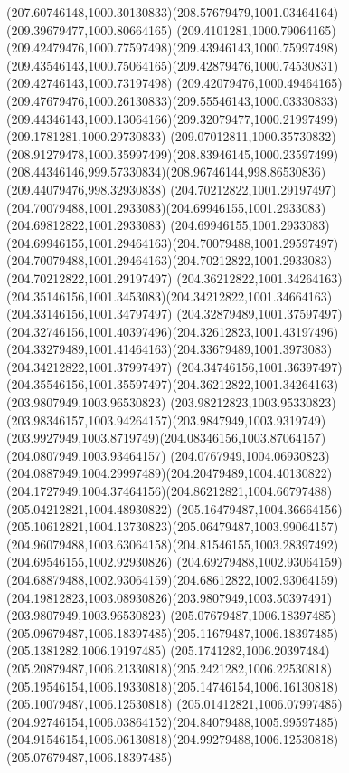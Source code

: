{{		\curveto(207.60746148,1000.30130833)(208.57679479,1001.03464164)(209.39679477,1000.80664165)
		\curveto(209.4101281,1000.79064165)(209.42479476,1000.77597498)(209.43946143,1000.75997498)
		\curveto(209.43546143,1000.75064165)(209.42879476,1000.74530831)(209.42746143,1000.73197498)
		\curveto(209.42079476,1000.49464165)(209.47679476,1000.26130833)(209.55546143,1000.03330833)
		\curveto(209.44346143,1000.13064166)(209.32079477,1000.21997499)(209.1781281,1000.29730833)
		\curveto(209.07012811,1000.35730832)(208.91279478,1000.35997499)(208.83946145,1000.23597499)
		\curveto(208.44346146,999.57330834)(208.96746144,998.86530836)(209.44079476,998.32930838)
		\moveto(204.70212822,1001.29197497)
		\curveto(204.70079488,1001.2933083)(204.69946155,1001.2933083)(204.69812822,1001.2933083)
		\curveto(204.69946155,1001.2933083)(204.69946155,1001.29464163)(204.70079488,1001.29597497)
		\curveto(204.70079488,1001.29464163)(204.70212822,1001.2933083)(204.70212822,1001.29197497)
		\moveto(204.36212822,1001.34264163)
		\curveto(204.35146156,1001.3453083)(204.34212822,1001.34664163)(204.33146156,1001.34797497)
		\curveto(204.32879489,1001.37597497)(204.32746156,1001.40397496)(204.32612823,1001.43197496)
		\curveto(204.33279489,1001.41464163)(204.33679489,1001.3973083)(204.34212822,1001.37997497)
		\curveto(204.34746156,1001.36397497)(204.35546156,1001.35597497)(204.36212822,1001.34264163)
		\moveto(203.9807949,1003.96530823)
		\curveto(203.98212823,1003.95330823)(203.98346157,1003.94264157)(203.9847949,1003.9319749)
		\curveto(203.9927949,1003.8719749)(204.08346156,1003.87064157)(204.0807949,1003.93464157)
		\curveto(204.0767949,1004.06930823)(204.0887949,1004.29997489)(204.20479489,1004.40130822)
		\curveto(204.1727949,1004.37464156)(204.86212821,1004.66797488)(205.04212821,1004.48930822)
		\curveto(205.16479487,1004.36664156)(205.10612821,1004.13730823)(205.06479487,1003.99064157)
		\curveto(204.96079488,1003.63064158)(204.81546155,1003.28397492)(204.69546155,1002.92930826)
		\curveto(204.69279488,1002.93064159)(204.68879488,1002.93064159)(204.68612822,1002.93064159)
		\curveto(204.19812823,1003.08930826)(203.9807949,1003.50397491)(203.9807949,1003.96530823)
		\moveto(205.07679487,1006.18397485)
		\curveto(205.09679487,1006.18397485)(205.11679487,1006.18397485)(205.1381282,1006.19197485)
		\curveto(205.1741282,1006.20397484)(205.20879487,1006.21330818)(205.2421282,1006.22530818)
		\curveto(205.19546154,1006.19330818)(205.14746154,1006.16130818)(205.10079487,1006.12530818)
		\curveto(205.01412821,1006.07997485)(204.92746154,1006.03864152)(204.84079488,1005.99597485)
		\curveto(204.91546154,1006.06130818)(204.99279488,1006.12530818)(205.07679487,1006.18397485)
}}
